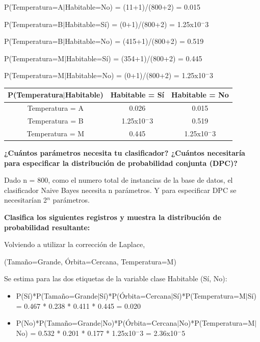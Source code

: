 \documentclass[11pt]{exam}
\begin{document}
\begin{questions}
P(Temperatura=A$|$Habitable=No) = (11+1)/(800+2) = 0.015

P(Temperatura=B$|$Habitable=Sí) = (0+1)/(800+2) = 1.25x10$^-3$

P(Temperatura=B$|$Habitable=No) = (415+1)/(800+2) = 0.519

P(Temperatura=M$|$Habitable=Sí) = (354+1)/(800+2) = 0.445

P(Temperatura=M$|$Habitable=No) = (0+1)/(800+2) = 1.25x10$^-3$

\begin{center}
	\begin{tabular}{ |c|c|c| } 
		\hline
		P(Temperatura$|$Habitable) & Habitable = Sí & Habitable = No \\
		\hline
		Temperatura = A & 0.026 & 0.015 \\ 
		\hline
		Temperatura = B & 1.25x10$^-3$ & 0.519 \\ 
		\hline
		Temperatura = M & 0.445 & 1.25x10$^-3$ \\ 
		\hline
	\end{tabular}
\end{center}

{\bf \question ¿Cuántos parámetros necesita tu clasificador? ¿Cuántos necesitaría para especificar la distribución de probabilidad conjunta (DPC)?}

Dado n = 800, como el numero total de instancias de la base de datos, el clasificador Naive Bayes necesita n parámetros. Y para especificar DPC se necesitarían 2$^n$ parámetros.

{{\bf \question Clasifica los siguientes registros y muestra la distribución de probabilidad resultante:}
	
Volviendo a utilizar la corrección de Laplace,

\begin{enumerate}
	{\bf \item (Tamaño=Grande, Órbita=Cercana, Temperatura=M)}
	
	Se estima para las dos etiquetas de la variable clase Habitable (Sí, No): 
	
	\begin{itemize}
		\item P(Sí)*P(Tamaño=Grande$|$Sí)*P(Órbita=Cercana$|$Sí)*P(Temperatura=M$|$Sí) = 0.467 * 0.238 * 0.411 * 0.445 = 0.020 
		
		\item P(No)*P(Tamaño=Grande$|$No)*P(Órbita=Cercana$|$No)*P(Temperatura=M$|$No) = 0.532 * 0.201 * 0.177 * 1.25x10$^-3$ = 2.36x10$^-5$


\end{itemize}
\end{enumerate}}
\end{questions}
\end{document}
